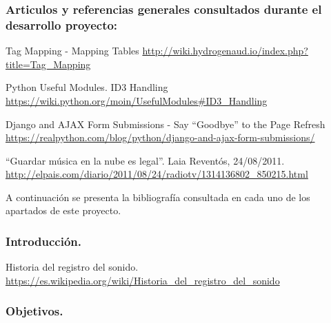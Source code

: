 \label{cap:bibliografia}

\subsubsection*{Articulos y referencias generales consultados durante el desarrollo proyecto:}

 Tag Mapping - Mapping Tables \url{http://wiki.hydrogenaud.io/index.php?title=Tag_Mapping}

 Python Useful Modules. ID3 Handling \url{https://wiki.python.org/moin/UsefulModules#ID3_Handling}

 Django and AJAX Form Submissions - Say ``Goodbye'' to the Page Refresh \url{https://realpython.com/blog/python/django-and-ajax-form-submissions/}

 ``Guardar música en la nube es legal''. Laia Reventós, 24/08/2011. \url{http://elpais.com/diario/2011/08/24/radiotv/1314136802_850215.html}


A continuación se presenta la bibliografía consultada en cada uno de los apartados de este proyecto.

\bigskip

\subsubsection*{Introducción.}

 Historia del registro del sonido. \url{https://es.wikipedia.org/wiki/Historia_del_registro_del_sonido}

\subsubsection*{Objetivos.}

